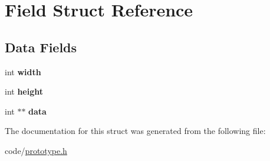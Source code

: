 \hypertarget{structField}{}\section{Field Struct Reference}
\label{structField}
\subsection*{Data Fields}
\begin{DoxyCompactItemize}
\item 
int {\bfseries width}\hypertarget{structField_ae4c63348414c54e94f4381a46d8607dd}{}\label{structField_ae4c63348414c54e94f4381a46d8607dd}

\item 
int {\bfseries height}\hypertarget{structField_a1415e0c5d74c47bef138f00a6fd0e70a}{}\label{structField_a1415e0c5d74c47bef138f00a6fd0e70a}

\item 
int $\ast$$\ast$ {\bfseries data}\hypertarget{structField_a98eace7614945451776fa74354e501b7}{}\label{structField_a98eace7614945451776fa74354e501b7}

\end{DoxyCompactItemize}


The documentation for this struct was generated from the following file\+:\begin{DoxyCompactItemize}
\item 
code/\hyperlink{prototype_8h}{prototype.\+h}\end{DoxyCompactItemize}
